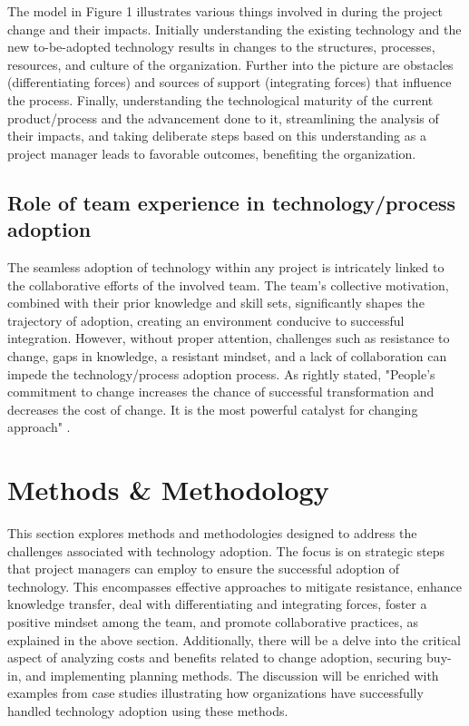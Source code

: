 \documentclass{article}
\begin{document}
\noindent The model in Figure 1 illustrates various things involved in during the project change and their impacts. Initially understanding the existing technology and the new to-be-adopted technology results in changes to the structures, processes, resources, and culture of the organization. Further into the picture are obstacles (differentiating forces) and sources of support (integrating forces) that influence the process. Finally, understanding the technological maturity of the current product/process and the advancement done to it, streamlining the analysis of their impacts, and taking deliberate steps based on this understanding as a project manager leads to favorable outcomes, benefiting the organization.

\subsection{Role of team experience in technology/process adoption}

The seamless adoption of technology within any project is intricately linked to the collaborative efforts of the involved team. The team's collective motivation, combined with their prior knowledge and skill sets, significantly shapes the trajectory of adoption, creating an environment conducive to successful integration. However, without proper attention, challenges such as resistance to change, gaps in knowledge, a resistant mindset, and a lack of collaboration can impede the technology/process adoption process. As rightly stated, "People's commitment to change increases the chance of successful transformation and decreases the cost of change. It is the most powerful catalyst for changing approach" \cite{reference2}.


\section{Methods \& Methodology}
This section explores methods and methodologies designed to address the challenges associated with technology adoption. The focus is on strategic steps that project managers can employ to ensure the successful adoption of technology. This encompasses effective approaches to mitigate resistance, enhance knowledge transfer, deal with differentiating and integrating forces, foster a positive mindset among the team, and promote collaborative practices, as explained in the above section. Additionally, there will be a delve into the critical aspect of analyzing costs and benefits related to change adoption, securing buy-in, and implementing planning methods. The discussion will be enriched with examples from case studies illustrating how organizations have successfully handled technology adoption using these methods.
\end{document}
